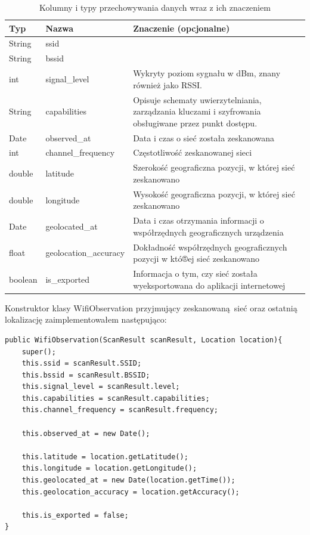 \begin{table}
\caption{Kolumny i typy przechowywania danych wraz z ich znaczeniem}
\label{table:dbscheme}
\begin{tabular} { |l|l|p{7cm}|  }
\hline
Typ & Nazwa & Znaczenie (opcjonalne) \\
\hline
\hline
String & ssid & \\
\hline
String & bssid & \\
\hline
int & signal_level & Wykryty poziom sygnału w dBm, znany również jako RSSI.\cite{scanResultAndroidDocs} \\
\hline
String & capabilities & Opisuje schematy uwierzytelniania, zarządzania kluczami i szyfrowania obsługiwane przez punkt dostępu.\cite{scanResultAndroidDocs} \\
\hline
Date & observed_at & Data i czas o sieć została zeskanowana \\
\hline
int & channel_frequency & Częstotliwość zeskanowanej sieci \\
\hline
double & latitude & Szerokość geograficzna pozycji, w której sieć zeskanowano \\
\hline
double & longitude & Wysokość geograficzna pozycji, w której sieć zeskanowano \\
\hline
Date & geolocated_at & Data i czas otrzymania informacji o współrzędnych geograficznych urządzenia \\
\hline
float & geolocation_accuracy & Dokładność współrzędnych geograficznych pozycji w któ®ej sieć zeskanowano \\
\hline
boolean & is_exported & Informacja o tym, czy sieć została wyeksportowana do aplikacji internetowej \\
\hline
\end{tabular}
\end{table}

Konstruktor klasy WifiObservation przyjmujący zeskanowaną sieć oraz ostatnią lokalizację zaimplementowałem następująco:
\begin{verbatim}
public WifiObservation(ScanResult scanResult, Location location){
    super();
    this.ssid = scanResult.SSID;
    this.bssid = scanResult.BSSID;
    this.signal_level = scanResult.level;
    this.capabilities = scanResult.capabilities;
    this.channel_frequency = scanResult.frequency;

    this.observed_at = new Date();

    this.latitude = location.getLatitude();
    this.longitude = location.getLongitude();
    this.geolocated_at = new Date(location.getTime());
    this.geolocation_accuracy = location.getAccuracy();

    this.is_exported = false;
}
\end{verbatim}

